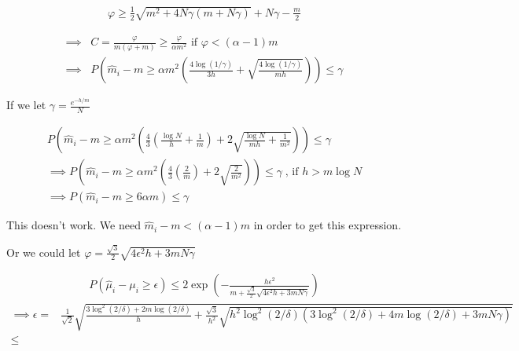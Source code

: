 \documentclass{article}
\newcommand{\eqn}[1]{\begin{align}#1\end{align}}
\theoremstyle{plain}
\theoremstyle{definition}
\begin{document}
\eqn{
\varphi \geq \frac{1}{2}\sqrt{m^2+4N\gamma(m+N\gamma)} + N\gamma - \frac{m}{2}
}










\pagebreak

\eqn{
 \implies & C = \frac{\varphi}{m(\varphi+m)}  \geq \frac{\varphi}{\alpha m^2} \text{ if } \varphi < (\alpha-1)m\\
\implies & P\left(\hat{m}_i - m \geq \alpha m^2 \left( \frac{4\log(1/\gamma)}{3h}+\sqrt{\frac{4\log(1/\gamma)}{mh}} \right)\right) \leq \gamma
}

If we let $\gamma = \frac{e^{-h/m}}{N}$

\eqn{
P\left(\hat{m}_i - m \geq \alpha m^2 \left( \frac{4}{3}(\frac{\log N}{h}+\frac{1}{m})+2\sqrt{\frac{\log N}{mh}+\frac{1}{m^2}} \right)\right) \leq \gamma \\
\implies P\left(\hat{m}_i - m \geq \alpha m^2 \left( \frac{4}{3}(\frac{2}{m})+2\sqrt{\frac{2}{m^2}} \right)\right) \leq \gamma \; \text{, if } h > m\log N \\
\implies P\left(\hat{m}_i - m \geq 6\alpha m \right) \leq \gamma
}

This doesn't work. We need $\hat{m}_i - m < (\alpha-1)m$ in order to get this expression.

Or we could let $\varphi = \frac{\sqrt{3}}{2}\sqrt{4\epsilon^2 h+3mN\gamma}$

\eqn{
P(\hat{\mu}_i-\mu_i \geq \epsilon) \leq 2\exp({-\frac{h\epsilon^2}{m+\frac{\sqrt{3}}{2}\sqrt{4\epsilon^2 h+3mN\gamma}}})
}
\eqn{
\implies \epsilon = & \frac{1}{\sqrt{2}}\sqrt{\frac{3 \log^2(2/\delta)+2m\log(2/\delta)}{h}+\frac{\sqrt{3}}{h^2}\sqrt{h^2\log^2(2/\delta)(3\log^2(2/\delta)+4m\log(2/\delta)+3mN\gamma)}} \\
\leq & 
}
\end{document}
